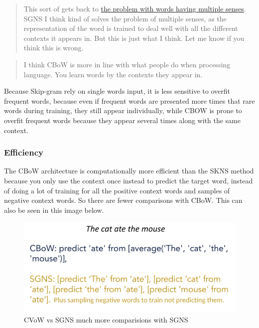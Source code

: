 \documentclass[
  11pt,
  british,
]{article}
\begin{document}
\begin{quote}
This sort of gets back to \href{Distributional\%20hypothesis.md}{the
problem with words having multiple senses}. SGNS I think kind of solves
the problem of multiple senses, as the representation of the word is
trained to deal well with all the different contexts it appears in. But
this is just what I think. Let me know if you think this is wrong.
\end{quote}

\begin{quote}
I think CBoW is more in line with what people do when processing
language. You learn words by the contexts they appear in.
\end{quote}

Because Skip-gram rely on single words input, it is less sensitive to
overfit frequent words, because even if frequent words are presented
more times that rare words during training, they still appear
individually, while CBOW is prone to overfit frequent words because they
appear several times along with the same context.

\hypertarget{efficiency}{%
\subsubsection{Efficiency}\label{efficiency}}

The CBoW architecture is computationally more efficient than the SKNS
method because you only use the context once instead to predict the
target word, instead of doing a lot of training for all the positive
context words and samples of negative context words. So there are fewer
comparisons with CBoW. This can also be seen in this image below.

\begin{figure}
\centering
\includegraphics{Pasted_image_20220604014153.png}
\caption{CVoW vs SGNS much more comparisions with SGNS}
\end{figure}
\end{document}
